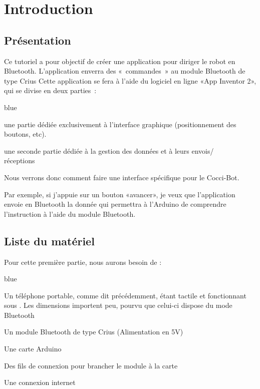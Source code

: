 
\chapter{Introduction}     

\section{Présentation}

Ce tutoriel a pour objectif de créer une application pour diriger le robot en Bluetooth. 
L'application enverra des « commandes » au module Bluetooth de type Crius 
Cette application se fera à l'aide du logiciel en ligne «App Inventor 2», qui se divise en deux parties : 

\begin{items}{blue}{\Triangle}
    \item une partie dédiée exclusivement à l'interface graphique
	  (positionnement des boutons, etc).
	\item une seconde partie dédiée à la gestion des données et à leurs envois/\\réceptions
\end{items}

\noindent
Nous verrons donc comment faire une interface spécifique pour le Cocci-Bot. \\




Par exemple, si j'appuie sur un bouton «avancer», je veux que l'application envoie en Bluetooth la donnée qui permettra à l'Arduino de comprendre l'instruction  à l'aide  du module Bluetooth.


\section{Liste du matériel}

Pour cette première partie, nous aurons besoin de : 

\begin{items}{blue}{\Triangle}
    \item Un téléphone portable, comme dit précédemment, étant tactile et fonctionnant sous . Les dimensions importent peu, pourvu que celui-ci dispose du mode Bluetooth
    \item Un module Bluetooth de type Crius (Alimentation en 5V)
    \item Une carte Arduino 
    \item Des fils de connexion pour brancher le module à la carte
    \item Une connexion internet
\end{items}


